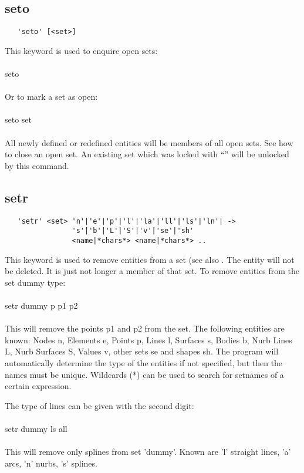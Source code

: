 \documentclass{article}
\begin{document}
\subsection{\label{seto}seto}
\begin{verbatim}
   'seto' [<set>] 
\end{verbatim}
This keyword is used to enquire open sets:\\\\
seto\\\\
Or to mark a set as open:\\\\
seto set\\\\
All newly defined or redefined entities will be members of all open sets. See  how to close an open set. An existing set which was locked with ``'' will be unlocked by this command.

\subsection{\label{setr}setr}
\begin{verbatim}
   'setr' <set> 'n'|'e'|'p'|'l'|'la'|'ll'|'ls'|'ln'| ->
                's'|'b'|'L'|'S'|'v'|'se'|'sh'
                <name|*chars*> <name|*chars*> .. 
\end{verbatim}
This keyword is used to remove entities from a set (see also . The entity will not be deleted. It is just not longer a member of that set. To remove entities from the set dummy type:\\\\setr dummy p p1 p2\\\\This will remove the points p1 and p2 from the set. The following entities are known: Nodes n, Elements e, Points p, Lines l, Surfaces s, Bodies b, Nurb Lines L, Nurb Surfaces S, Values v, other sets se and shapes sh. The program will automatically determine the type of the entities if not specified, but then the names must be unique. Wildcards (*) can be used to search for setnames of a certain expression.

The type of lines can be given with the second digit:\\\\setr dummy ls
all\\\\This will remove only splines from set 'dummy'. Known are 'l' straight
lines, 'a' arcs, 'n' nurbs, 's' splines.
\end{document}

